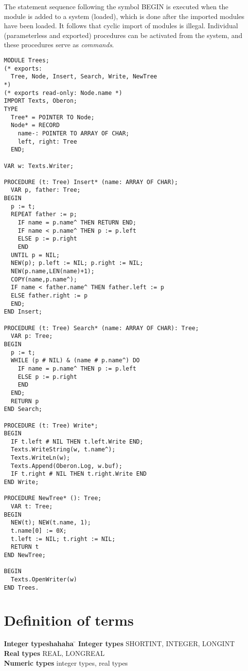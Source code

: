 The statement sequence following the symbol BEGIN is
executed when the module is added to a system (loaded), which is done
after the imported modules have been loaded. It follows that cyclic
import of modules is illegal. Individual (parameterless and exported)
procedures can be activated from the system, and these procedures
serve as {\em commands}.
{\small
\begin{verbatim}
MODULE Trees;
(* exports:
  Tree, Node, Insert, Search, Write, NewTree
*)
(* exports read-only: Node.name *)
IMPORT Texts, Oberon;
TYPE
  Tree* = POINTER TO Node;
  Node* = RECORD
    name-: POINTER TO ARRAY OF CHAR;
    left, right: Tree
  END;

VAR w: Texts.Writer;

PROCEDURE (t: Tree) Insert* (name: ARRAY OF CHAR);
  VAR p, father: Tree;
BEGIN
  p := t;
  REPEAT father := p;
    IF name = p.name^ THEN RETURN END;
    IF name < p.name^ THEN p := p.left
    ELSE p := p.right
    END
  UNTIL p = NIL;
  NEW(p); p.left := NIL; p.right := NIL;
  NEW(p.name,LEN(name)+1);
  COPY(name,p.name^);
  IF name < father.name^ THEN father.left := p
  ELSE father.right := p
  END;
END Insert;

PROCEDURE (t: Tree) Search* (name: ARRAY OF CHAR): Tree;
  VAR p: Tree;
BEGIN
  p := t;
  WHILE (p # NIL) & (name # p.name^) DO
    IF name = p.name^ THEN p := p.left
    ELSE p := p.right
    END
  END;
  RETURN p
END Search;

PROCEDURE (t: Tree) Write*;
BEGIN
  IF t.left # NIL THEN t.left.Write END;
  Texts.WriteString(w, t.name^);
  Texts.WriteLn(w);
  Texts.Append(Oberon.Log, w.buf);
  IF t.right # NIL THEN t.right.Write END
END Write;

PROCEDURE NewTree* (): Tree;
  VAR t: Tree;
BEGIN
  NEW(t); NEW(t.name, 1);
  t.name[0] := 0X;
  t.left := NIL; t.right := NIL;
  RETURN t
END NewTree;

BEGIN
  Texts.OpenWriter(w)
END Trees.
\end{verbatim}
}

\section{Definition of terms}\label{o2r:terms}

\begin{tabbing}
{\bf Integer typeshahaha}  \=  \kill
{\bf Integer types}  \>       SHORTINT, INTEGER, LONGINT \\
{\bf Real types}     \>       REAL, LONGREAL \\
{\bf Numeric types}  \>       integer types, real types \\
\end{tabbing}


